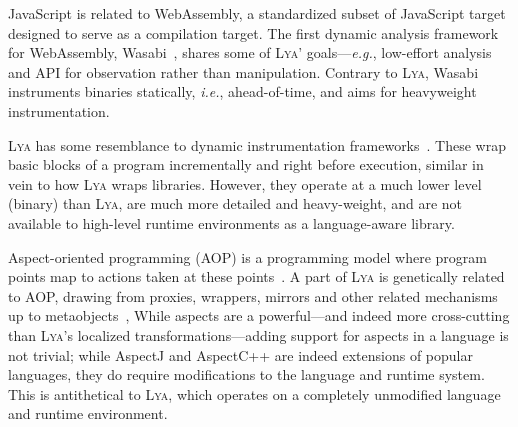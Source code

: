 \documentclass[letterpaper,twocolumn,10pt]{article}
\def\eg{{\em e.g.}, }
\def\ie{{\em i.e.}, }
\newcommand{\sx}[1]{(\S\ref{#1})}
\newcommand{\sys}{{\scshape Lya}\xspace}
\newcommand{\fixme}[1]{{\color{red}#1}}
\begin{document}

JavaScript is related to WebAssembly, a standardized subset of JavaScript target designed to serve as a compilation target.
The first dynamic analysis framework for WebAssembly, Wasabi~\cite{wasabi}, shares some of \sys' goals---\eg low-effort analysis and API for observation rather than manipulation.
Contrary to \sys, Wasabi instruments binaries statically, \ie ahead-of-time, and aims for heavyweight instrumentation.

\sys has some resemblance to dynamic instrumentation frameworks~\cite{pin, valgrind, disl, roadrunner}.
These wrap basic blocks of a program incrementally and right before execution, similar in vein to how \sys wraps libraries.
However, they operate at a much lower level (binary) than \sys, are much more detailed and heavy-weight, and are not available to high-level runtime environments as a language-aware library.

Aspect-oriented programming (AOP) is a programming model where program points map to actions taken at these points~\cite{aop}.
A part of \sys is genetically related to AOP, drawing from proxies, wrappers, mirrors and other related mechanisms up to  metaobjects~\cite{metaobject},
While aspects are a powerful---and indeed more cross-cutting than \sys's localized transformations---adding support for aspects in a language is not trivial;
  while AspectJ and AspectC++ are indeed extensions of popular languages, they do require modifications to the language and runtime system.
This is antithetical to \sys, which operates on a completely unmodified language and runtime environment.
\end{document}

